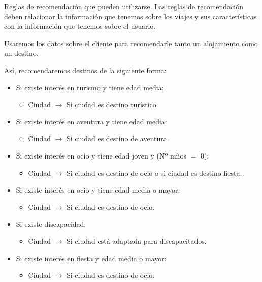 \documentclass[11pt, a4paper, spanish, openright, twoside]{book}
\begin{document}
		\begin{section}{Reglas de recomendación que pueden utilizarse.}
			Las reglas de recomendación deben relacionar la información que tenemos sobre los viajes y sus características con la información que tenemos 
			sobre el usuario.
			
			
			Usaremos los datos sobre el cliente para recomendarle tanto un alojamiento como un destino. 
			
			Así, recomendaremos destinos de la siguiente forma:
			
				\begin{itemize}

					\item Si existe interés en turismo y tiene edad media:
						\begin{itemize}
							\item Ciudad $\rightarrow$  Si ciudad es destino turístico.
						\end{itemize}
					\item Si existe interés en aventura y tiene edad media:						
						\begin{itemize}
							\item Ciudad $\rightarrow$  Si ciudad es destino de aventura.
						\end{itemize}
					\item Si existe interés en ocio y tiene edad joven y (Nº niños $=$ 0):
						\begin{itemize}
							\item Ciudad $\rightarrow$  Si ciudad es destino de ocio o si ciudad es destino fiesta.
						\end{itemize}
					\item Si existe interés en ocio y tiene edad media o mayor:
						\begin{itemize}
							\item Ciudad $\rightarrow$  Si ciudad es destino de ocio.
						\end{itemize}
					\item Si existe discapacidad:						
						\begin{itemize}
							\item Ciudad $\rightarrow$  Si ciudad está adaptada para discapacitados.
						\end{itemize}
					\item Si existe interés en fiesta y edad media o mayor:
						\begin{itemize}
							\item Ciudad $\rightarrow$  Si ciudad es destino de ocio.

\end{itemize}
\end{itemize}
\end{section}
\end{document}
